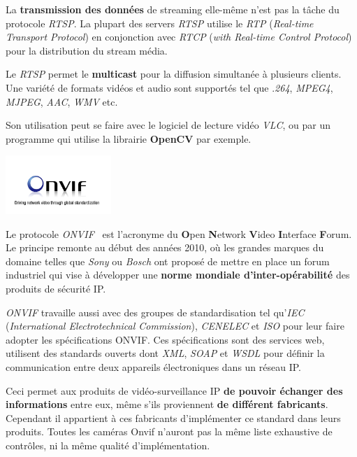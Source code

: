 La \textbf{transmission des données} de streaming elle-même n'est pas la tâche du protocole \textit{RTSP}. La plupart des servers \textit{RTSP} utilise le \textit{RTP} (\textit{Real-time Transport Protocol}) en conjonction avec \textit{RTCP} (\textit{with Real-time Control Protocol}) pour la distribution du stream média.~\cite{RTSP}

Le \textit{RTSP} permet le \textbf{multicast} pour la diffusion simultanée à plusieurs clients. Une variété de formats vidéos et audio sont supportés tel que .\textit{264}, \textit{MPEG4}, \textit{MJPEG}, \textit{AAC}, \textit{WMV} etc.

Son utilisation peut se faire avec le logiciel de lecture vidéo \textit{VLC}, ou par un programme qui utilise la librairie \textbf{OpenCV} par exemple.

        
          \begin{minipage}{0.2\textwidth}
  \centering
  \includegraphics[width=4cm]{img/logoonvif.png}
\end{minipage}
\hfill%
\begin{minipage}{0.7\textwidth}
Le protocole \textit{ONVIF}~\cite{Onvif} est l'acronyme du \textbf{O}pen \textbf{N}etwork \textbf{V}ideo \textbf{I}nterface \textbf{F}orum. Le principe remonte au début des années 2010, où les grandes marques du domaine telles que \textit{Sony} ou \textit{Bosch} ont proposé de mettre en place un forum industriel qui vise à développer une \textbf{norme mondiale d'inter-opérabilité} des produits de sécurité IP. 
  \end{minipage}\par
  
  \textit{ONVIF} travaille aussi avec des groupes de standardisation tel qu'\textit{IEC} (\textit{International Electrotechnical Commission}), \textit{CENELEC} et \textit{ISO} pour leur faire adopter les spécifications ONVIF. Ces spécifications sont des services web, utilisent des standards ouverts dont \textit{XML}, \textit{SOAP} et \textit{WSDL} pour définir la communication entre deux appareils électroniques dans un réseau IP.

Ceci permet aux produits de vidéo-surveillance IP \textbf{de pouvoir échanger des informations} entre eux, même s'ils proviennent \textbf{de différent fabricants}. Cependant il appartient à ces fabricants d'implémenter ce standard dans leurs produits. Toutes les caméras Onvif n'auront pas la même liste exhaustive de contrôles, ni la même qualité d'implémentation.

